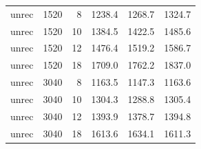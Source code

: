 \documentclass[11pt,a4paper,]{article}
\let\origtable\table
\let\endorigtable\endtable
\renewenvironment{table}[1][2] {
    \expandafter\origtable\expandafter[!htbp]
} {
    \endorigtable
}
\begin{document}
\begin{table}[!h]
\begin{tabular}[t]{lrrrrr}
unrec & 1520 & 8 & 1238.4 & 1268.7 & 1324.7\\
unrec & 1520 & 10 & 1384.5 & 1422.5 & 1485.6\\
unrec & 1520 & 12 & 1476.4 & 1519.2 & 1586.7\\
unrec & 1520 & 18 & 1709.0 & 1762.2 & 1837.0\\
unrec & 3040 & 8 & 1163.5 & 1147.3 & 1163.6\\
unrec & 3040 & 10 & 1304.3 & 1288.8 & 1305.4\\
unrec & 3040 & 12 & 1393.9 & 1378.7 & 1394.8\\
unrec & 3040 & 18 & 1613.6 & 1634.1 & 1611.3\\
\bottomrule
\end{tabular}
\end{table}

\begin{table}[!h]


\end{table}
\end{document}
